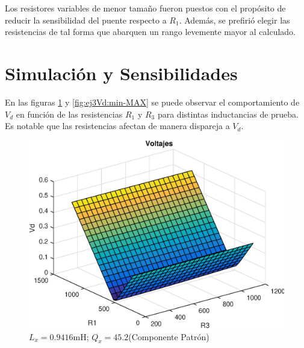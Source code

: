     \begin{figure}[ht!]
        \begin{center}
            
        \end{center}
    \end{figure}

    Los resistores variables de menor tamaño fueron puestos con el propósito de reducir
    la sensibilidad del puente respecto a $R_1$. Además, se prefirió elegir las resistencias
    de tal forma que abarquen un rango levemente mayor al calculado.

    \newpage
    \section{Simulación y Sensibilidades}

    En las figuras \ref{fig:ej3Vd:patron} y \ref{fig:ej3Vd:min-MAX} se puede observar el comportamiento
    de $V_d$ en función de las resistencias $R_1$ y $R_3$ para distintas inductancias de prueba.
    Es notable que las resistencias afectan de manera dispareja a $V_d$.
    
    \begin{figure}[ht]
        \begin{center}
            \includegraphics[width=0.45\linewidth]{MATLAB/ej3Vd}
            \caption{$L_x=0.9416\si{\milli\henry}$; $Q_x=45.2$(Componente Patrón)}
            \label{fig:ej3Vd:patron}
        \end{center}
    \end{figure}

